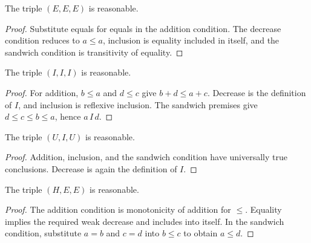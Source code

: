 \begin{lemma}
The triple $(E,E,E)$ is reasonable.
\end{lemma}
\begin{proof}
Substitute equals for equals in the addition condition. The decrease
condition reduces to $a\leq a$, inclusion is equality included in itself,
and the sandwich condition is transitivity of equality.
\end{proof}

\begin{lemma}
The triple $(I,I,I)$ is reasonable.
\end{lemma}
\begin{proof}
For addition, $b\leq a$ and $d\leq c$ give $b+d\leq a+c$. Decrease is
the definition of $I$, and inclusion is reflexive inclusion. The sandwich
premises give $d\leq c\leq b\leq a$, hence $a\,I\,d$.
\end{proof}

\begin{lemma}
The triple $(U,I,U)$ is reasonable.
\end{lemma}
\begin{proof}
Addition, inclusion, and the sandwich condition have universally true
conclusions. Decrease is again the definition of $I$.
\end{proof}

\begin{lemma}
The triple $(H,E,E)$ is reasonable.
\end{lemma}
\begin{proof}
The addition condition is monotonicity of addition for $\leq$. Equality
implies the required weak decrease and includes into itself. In the sandwich
condition, substitute $a=b$ and $c=d$ into $b\leq c$ to obtain $a\leq d$.
\end{proof}

